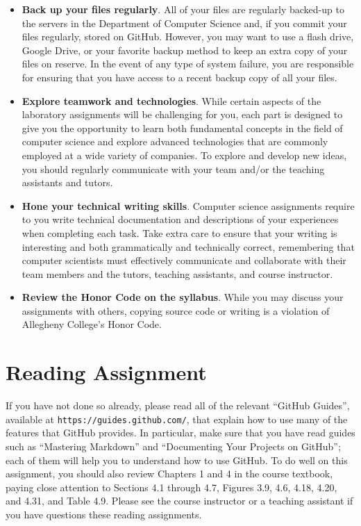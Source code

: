 \documentclass[11pt]{article}
\newcommand{\url}[1]{\lstinline{#1}}
\begin{document}
\begin{itemize}
\item {\bf Back up your files regularly}. All of your files are regularly backed-up to the servers in the Department of
  Computer Science and, if you commit your files regularly, stored on GitHub. However, you may want to use a flash
  drive, Google Drive, or your favorite backup method to keep an extra copy of your files on reserve. In the event of
  any type of system failure, you are responsible for ensuring that you have access to a recent backup copy of all your
  files.

\item {\bf Explore teamwork and technologies}. While certain aspects of the laboratory assignments will be challenging
  for you, each part is designed to give you the opportunity to learn both fundamental concepts in the field of computer
  science and explore advanced technologies that are commonly employed at a wide variety of companies. To explore and
  develop new ideas, you should regularly communicate with your team and/or the teaching assistants and tutors.

\item {\bf Hone your technical writing skills}. Computer science assignments require to you write technical
  documentation and descriptions of your experiences when completing each task. Take extra care to ensure that your
  writing is interesting and both grammatically and technically correct, remembering that computer scientists must
  effectively communicate and collaborate with their team members and the tutors, teaching assistants, and course
  instructor.

\item {\bf Review the Honor Code on the syllabus}. While you may discuss your assignments with others, copying source
  code or writing is a violation of Allegheny College's Honor Code.

\end{itemize}

\section*{Reading Assignment}

If you have not done so already, please read all of the relevant ``GitHub
Guides'', available at \url{https://guides.github.com/}, that explain how to use
many of the features that GitHub provides. In particular, make sure that you
have read guides such as ``Mastering Markdown'' and ``Documenting Your Projects
on GitHub''; each of them will help you to understand how to use GitHub. To do
well on this assignment, you should also review Chapters 1 and 4 in the course
textbook, paying close attention to Sections 4.1 through 4.7, Figures 3.9, 4.6,
4.18, 4.20, and 4.31, and Table 4.9. Please see the course instructor or a
teaching assistant if you have questions these reading assignments.
\end{document}

